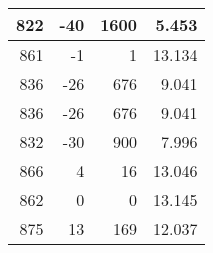 \begin{longtable}{|r|r|r|r|}
	822                                                                                             & -40                                               & 1600                                                 & 5.453                                                                                          \\ \hline
	861                                                                                             & -1                                                & 1                                                    & 13.134                                                                                         \\ \hline
	836                                                                                             & -26                                               & 676                                                  & 9.041                                                                                          \\ \hline
	836                                                                                             & -26                                               & 676                                                  & 9.041                                                                                          \\ \hline
	832                                                                                             & -30                                               & 900                                                  & 7.996                                                                                          \\ \hline
	866                                                                                             & 4                                                 & 16                                                   & 13.046                                                                                         \\ \hline
	862                                                                                             & 0                                                 & 0                                                    & 13.145                                                                                         \\ \hline
	875                                                                                             & 13                                                & 169                                                  & 12.037                                                                                         \\ \hline

\end{longtable}
